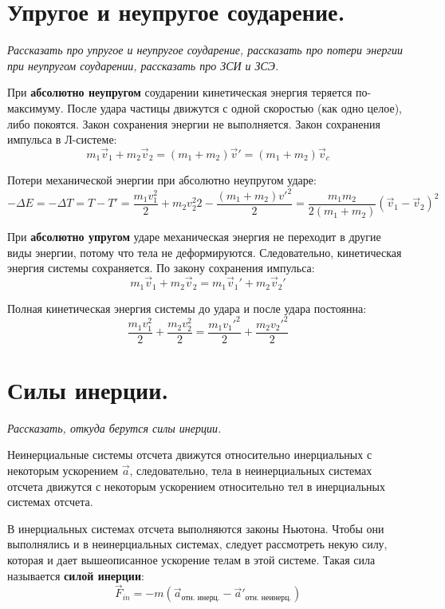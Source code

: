 \documentclass{article}
\begin{document}
   \section{Упругое и неупругое соударение.}
    \par
      \textit{Рассказать про упругое и неупругое соударение, рассказать про потери энергии при неупругом соударении, рассказать про ЗСИ и ЗСЭ.}\\
    \par 
      При \textbf{абсолютно неупругом} соударении кинетическая энергия теряется по-максимуму. После удара частицы движутся с одной скоростью (как одно целое), либо покоятся. Закон сохранения энергии не выполняется. Закон сохранения импульса в Л-системе:
      \begin{equation}
	m_1\vec v_1+m_2\vec v_2=(m_1+m_2)\vec v'=(m_1+m_2)\vec v_c
      \end{equation}
    \par
      Потери механической энергии при абсолютно неупругом ударе:
      \begin{equation}
	-\Delta E = -\Delta T = T-T'=\frac{m_1v_1^2}{2}+{m_2v_2^2}{2}-\frac{(m_1+m_2)v'^2}{2}=\frac{m_1m_2}{2(m_1+m_2)}(\vec v_1-\vec v_2)^2
      \end{equation}
    \par
      При \textbf{абсолютно упругом} ударе механическая энергия не переходит в другие виды энергии, потому что тела не деформируются. Следовательно, кинетическая энергия системы сохраняется. По закону сохранения импульса:
      \begin{equation}
	m_1\vec v_1+m_2\vec v_2=m_1\vec v_1'+m_2\vec v_2'
      \end{equation}
    \par
      Полная кинетическая энергия системы до удара и после удара постоянна:
      \begin{equation}
	\frac{m_1v_1^2}{2}+\frac{m_2v_2^2}{2}=\frac{m_1v_1'^2}{2}+\frac{m_2v_2'^2}{2}
      \end{equation}
  \clearpage
  
   \section{Силы инерции.}
    \par
      \textit{Рассказать, откуда берутся силы инерции.}\\
    \par 
      Неинерциальные системы отсчета движутся относительно инерциальных с некоторым ускорением $\vec a$, следовательно, тела в неинерциальных системах отсчета движутся с некоторым ускорением относительно тел в инерциальных системах отсчета.
    \par
      В инерциальных системах отсчета выполняются законы Ньютона. Чтобы они выполнялись и в неинерциальных системах, следует рассмотреть некую силу, которая и дает вышеописанное ускорение телам в этой системе. Такая сила называется \textbf{силой инерции}:
      \begin{equation}
	\vec F_{in}=-m(\vec a_\text{отн. инерц.}-\vec a'_\text{отн. неинерц.})
      \end{equation}
  \clearpage
    
\end{document}
